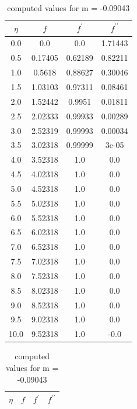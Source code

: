 \begin{table}
    \parbox{0.45\linewidth}{
        \centering
        \caption{computed values for m = 2.0}
        \begin{tabular}{|c|c|c|c|}
            \hline
            $\eta$ & $f$ & $f^\prime$ & $f^{\prime\prime}$ \\ \hline
            0.0 & 0.0 & 0.0 & 1.71443 \\ \hline
            0.5 & 0.17405 & 0.62189 & 0.82211 \\ \hline
            1.0 & 0.5618 & 0.88627 & 0.30046 \\ \hline
            1.5 & 1.03103 & 0.97311 & 0.08461 \\ \hline
            2.0 & 1.52442 & 0.9951 & 0.01811 \\ \hline
            2.5 & 2.02333 & 0.99933 & 0.00289 \\ \hline
            3.0 & 2.52319 & 0.99993 & 0.00034 \\ \hline
            3.5 & 3.02318 & 0.99999 & 3e-05 \\ \hline
            4.0 & 3.52318 & 1.0 & 0.0 \\ \hline
            4.5 & 4.02318 & 1.0 & 0.0 \\ \hline
            5.0 & 4.52318 & 1.0 & 0.0 \\ \hline
            5.5 & 5.02318 & 1.0 & 0.0 \\ \hline
            6.0 & 5.52318 & 1.0 & 0.0 \\ \hline
            6.5 & 6.02318 & 1.0 & 0.0 \\ \hline
            7.0 & 6.52318 & 1.0 & 0.0 \\ \hline
            7.5 & 7.02318 & 1.0 & 0.0 \\ \hline
            8.0 & 7.52318 & 1.0 & 0.0 \\ \hline
            8.5 & 8.02318 & 1.0 & 0.0 \\ \hline
            9.0 & 8.52318 & 1.0 & 0.0 \\ \hline
            9.5 & 9.02318 & 1.0 & 0.0 \\ \hline
            10.0 & 9.52318 & 1.0 & -0.0 \\ \hline
        \end{tabular}
        \label{table_m7}
    }
    \hfill
    \parbox{0.45\linewidth}{
        \centering
        \caption{computed values for m = -0.09043}
        \begin{tabular}{|c|c|c|c|}
            \hline
            $\eta$ & $f$ & $f^\prime$ & $f^{\prime\prime}$ \\ \hline

\end{tabular}}
\end{table}
